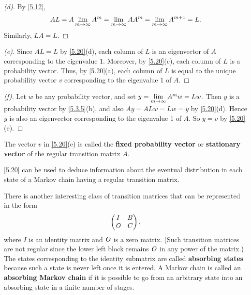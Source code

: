 \begin{proof}[(d)]
  By \cref{5.12},
  \[
    AL = A \lim\limits_{m \to \infty} A^m = \lim\limits_{m \to \infty} AA^m = \lim\limits_{m \to \infty} A^{m + 1} = L.
  \]
  Similarly, \(LA = L\).
\end{proof}

\begin{proof}[(e)]
  Since \(AL = L\) by \cref{5.20}(d), each column of \(L\) is an eigenvector of \(A\) corresponding to the eigenvalue \(1\).
  Moreover, by \cref{5.20}(c), each column of \(L\) is a probability vector.
  Thus, by \cref{5.20}(a), each column of \(L\) is equal to the unique probability vector \(v\) corresponding to the eigenvalue \(1\) of \(A\).
\end{proof}

\begin{proof}[(f)]
  Let \(w\) be any probability vector, and set \(y = \lim\limits_{m \to \infty} A^m w = Lw\).
  Then \(y\) is a probability vector by \cref{5.3.5}(b), and also \(Ay = ALw = Lw = y\) by \cref{5.20}(d).
  Hence \(y\) is also an eigenvector corresponding to the eigenvalue \(1\) of \(A\).
  So \(y = v\) by \cref{5.20}(e).
\end{proof}

\begin{defn}\label{5.3.16}
  The vector \(v\) in \cref{5.20}(e) is called the \textbf{fixed probability vector} or \textbf{stationary vector} of the regular transition matrix \(A\).
\end{defn}

\begin{note}
  \cref{5.20} can be used to deduce information about the eventual distribution in each state of a Markov chain having a regular transition matrix.
\end{note}

\begin{defn}\label{5.3.17}
  There is another interesting class of transition matrices that can be represented in the form
  \[
    \begin{pmatrix}
      I   & B \\
      \mathit{O} & C
    \end{pmatrix},
  \]
  where \(I\) is an identity matrix and \(\mathit{O}\) is a zero matrix.
  (Such transition matrices are not regular since the lower left block remains \(\mathit{O}\) in any power of the matrix.)
  The states corresponding to the identity submatrix are called \textbf{absorbing states} because such a state is never left once it is entered.
  A Markov chain is called an \textbf{absorbing Markov chain} if it is possible to go from an arbitrary state into an absorbing state in a finite number of stages.
\end{defn}

